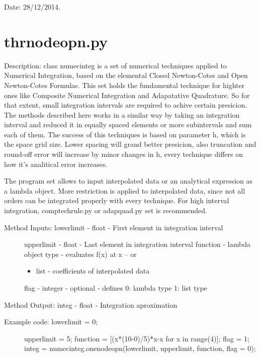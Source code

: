 \documentclass[letterpaper,10pt,oneside]{sphinxmanual}
\theoremstyle{plain}%
\theoremstyle{definition}%
\theoremstyle{remark}%
\begin{document}
Date: 28/12/2014.


\section{thrnodeopn.py}
\label{code:module-thrnodeopn}\label{code:thrnodeopn-py}
Description: class numecinteg is a set of numerical techniques applied to
Numerical Integration, based on the elemental Closed Newton-Cotes and
Open Newton-Cotes Formulas. This set holds the fundamental technique for
highter ones like Composite Numerical Integration and Adapatative Quadrature.
So for that extent, small integration intervals are required to achive certain
presicion. The methods described here works in a similar way by taking an
integration interval and reduced it in equally spaced elements or more 
subintervals and sum each of them. The success of this techniques is based
on parameter h, which is the space grid size. Lower spacing will grand better
presicion, also truncation and round-off error will increase by minor changes
in h, every technique differs on how it's analitical error increases.

The program set allows to input interpolated data or an analytical expression
as a lambda object. More restriction is applied to interpolated data, since
not all orders can be integrated properly with every technique. For high 
interval integration, comptechrule.py or adapquad.py set is recommended.
\begin{description}
\item[{Method Inputs: lowerlimit - float - First element in integration interval}] \leavevmode
upperlimit - float - Last element in integration interval
function - lambda object type - evaluates f(x) at x -- or
\begin{itemize}
\item {} 
list - coefficients of interpolated data

\end{itemize}

flag - integer - optional - defines 0: lambda type 1: list type

\end{description}

Method Output: integ - float - Integration aproximation
\begin{description}
\item[{Example code: lowerlimit = 0;}] \leavevmode
upperlimit = 5;
function = {[}(x*(10-0)/5)*x-x for x in range(4){]};
flag = 1;
integ =                   numecinteg.onenodeopn(lowerlimit, upperlimit, function, flag = 0);

\end{description}
\end{document}
